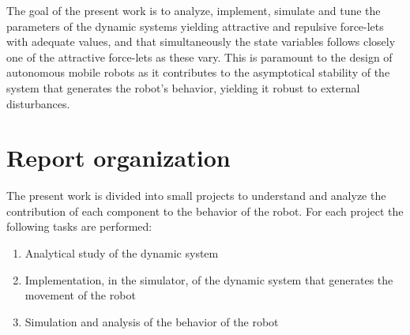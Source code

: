 The goal of the present work is to analyze, implement, simulate and tune the
parameters of the dynamic systems yielding attractive and repulsive force-lets
with adequate values, and that simultaneously the state variables follows
closely one of the attractive force-lets as these vary. This is paramount to the
design of autonomous mobile robots as it contributes to the asymptotical
stability of the system that generates the robot's behavior, yielding it robust
to external disturbances.

%
\section{Report organization}%
\label{sec:report-organisation}
The present work is divided into small projects to understand and analyze the
contribution of each component to the behavior of the robot. For each project
the following tasks are performed:
\begin{enumerate}
\item Analytical study of the dynamic system
\item Implementation, in the simulator, of the dynamic system that generates the
  movement of the robot
\item Simulation and analysis of the behavior of the robot
\end{enumerate}

